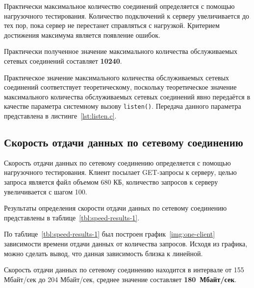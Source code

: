 Практически максимальное количество соединений определяется с помощью нагрузочного тестирования. Количество подключений к серверу увеличивается до тех пор, пока сервер не перестанет справляться с нагрузкой. Критерием достижения максимума является появление ошибок.

Практически полученное значение максимального количества обслуживаемых сетевых соединений составляет \textbf{10240}.

Практическое значение максимального количества обслуживаемых сетевых соединений соответствует теоретическому, поскольку теоретическое значение максимального количества обслуживаемых сетевых соединений явно передаётся в качестве параметра системному вызову \texttt{listen()}. Передача данного параметра представлена в листинге~\ref{lst:listen.c}. 


\subsection{Скорость отдачи данных по сетевому соединению}

Скорость отдачи данных по сетевому соединению определяется с помощью нагрузочного тестирования. Клиент посылает GET-запросы к серверу, целью запроса является файл объемом 680 КБ, количество запросов к серверу увеличивается с шагом 100.

Результаты определения скорости отдачи данных по сетевому соединению представлены в таблице~\ref{tbl:speed-results-1}.

По таблице~\ref{tbl:speed-results-1} был построен график~\ref{img:one-client} зависимости времени отдачи данных от количества запросов. Исходя из графика, можно сделать вывод, что данная зависимость близка к линейной.

\newpage

Скорость отдачи данных по сетевому соединению находится в интервале от 155 Мбайт/сек до 204 Мбайт/сек, среднее значение составляет \textbf{180~Мбайт/сек}.

